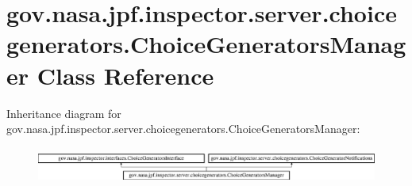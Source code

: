 \hypertarget{classgov_1_1nasa_1_1jpf_1_1inspector_1_1server_1_1choicegenerators_1_1_choice_generators_manager}{}\section{gov.\+nasa.\+jpf.\+inspector.\+server.\+choicegenerators.\+Choice\+Generators\+Manager Class Reference}
\label{classgov_1_1nasa_1_1jpf_1_1inspector_1_1server_1_1choicegenerators_1_1_choice_generators_manager}
Inheritance diagram for gov.\+nasa.\+jpf.\+inspector.\+server.\+choicegenerators.\+Choice\+Generators\+Manager\+:\begin{figure}[H]
\begin{center}
\leavevmode
\includegraphics[height=1.217391cm]{classgov_1_1nasa_1_1jpf_1_1inspector_1_1server_1_1choicegenerators_1_1_choice_generators_manager}
\end{center}
\end{figure}

